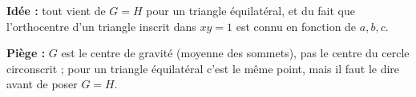 \textbf{Idée :} tout vient de $G=H$ pour un triangle équilatéral, et du fait que l'orthocentre d'un triangle inscrit dans $xy=1$ est connu en fonction de $a,b,c$.

\textbf{Piège :} $G$ est le centre de gravité (moyenne des sommets), pas le centre du cercle circonscrit ; pour un triangle équilatéral c'est le même point, mais il faut le dire avant de poser $G=H$.
